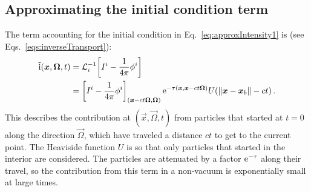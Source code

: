\subsection{Approximating the initial condition term}\label{sec:derIc}
The term accounting for the initial condition in
Eq.~\eqref{eq:approxIntensity1} is (see Eqs.~\eqref{eqs:inverseTransport}):
\begin{align*}
  \mathrm{ \tilde i }(\bm{x}, \bm{\Omega}, t) &=
    \mathcal{L}_{i}^{-1}\!\left[I^i - \frac1{4\pi} \phi^i\right]
  \\
  &= \left[ I^i - \frac1{4\pi} \phi^i \right]_{( \bm{x} - ct
  \bm{\Omega}, \bm{\Omega})}
    \mathop{}\!\mathrm{e}^{ -\tau(\bm{x}, \bm{x} - ct \bm{\Omega})}
    U( \left\| \bm{x} - \bm{x}_b \right\| - ct)\,.
\end{align*}
This describes the contribution at $(\vec{x}, \vec{\Omega}, t)$ from particles
that started at $t=0$ along the direction $\vec{\Omega}$, which have
traveled a distance $ct$ to get to the current point. The Heaviside function
$U$ is so that only particles that started in the interior are considered. The
particles are attenuated by a factor $\mathop{}\!\mathrm{e}^{ -\tau}$ along their travel, so
the contribution from this term in a non-vacuum is exponentially small at large
times.

